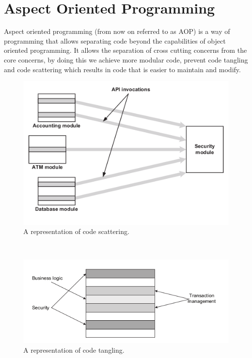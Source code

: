 \documentclass[a4paper]{report}
\begin{document}
\section{Aspect Oriented Programming}
Aspect oriented programming (from now on referred to as AOP) is a way of programming that allows separating code beyond the capabilities of object oriented programming. It allows the separation of cross cutting concerns from the core concerns, by doing this we achieve more modular code, prevent code tangling and code scattering which results in code that is easier to maintain and modify.
\begin{figure}[h!]
\centering
\includegraphics[scale=0.5]{images/Code_Scattering.png}
\caption{A representation of code scattering\cite{Laddad10}.}
\label{fig:Code_Scattering}
\end{figure}\\
\begin{figure}[h!]
\centering
\includegraphics[scale=0.5]{images/Code_Tangling.png}
\caption{A representation of code tangling\cite{Laddad10}.}
\label{fig:Code_Tangling}
\end{figure}\\
\end{document}
